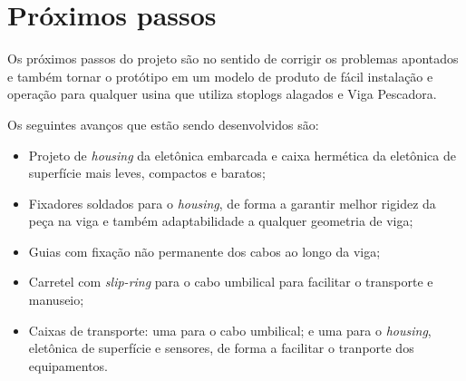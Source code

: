 \section{Próximos passos}

Os próximos passos do projeto são no sentido de corrigir os problemas apontados
e também tornar o protótipo em um modelo de produto de fácil instalação e
operação para qualquer usina que utiliza stoplogs alagados e Viga Pescadora.

Os seguintes avanços que estão sendo desenvolvidos são:
\begin{itemize}
  \item Projeto de \textit{housing} da eletônica embarcada e caixa hermética
  da eletônica de superfície mais leves, compactos e baratos;
  \item Fixadores soldados para o \textit{housing}, de forma a garantir melhor
  rigidez da peça na viga e também adaptabilidade a qualquer geometria de viga;
  \item Guias com fixação não permanente dos cabos ao longo da viga;
  \item Carretel com \textit{slip-ring} para o cabo umbilical para facilitar o
  transporte e manuseio;
  \item Caixas de transporte: uma para o cabo umbilical; e uma para o
  \textit{housing}, eletônica de superfície e sensores, de forma a facilitar o
  tranporte dos equipamentos.
\end{itemize}